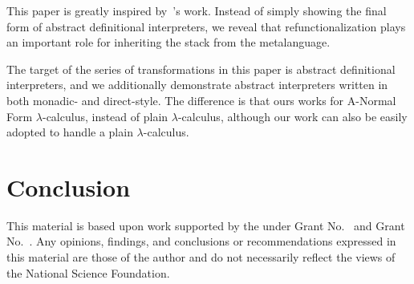 \documentclass[acmsmall,review,anonymous]{acmart}\settopmatter{printfolios=true,printccs=false,printacmref=false}
\begin{document}
This paper is greatly inspired by~\citeauthor{darais2017abstracting}'s work.
Instead of simply showing the final form of abstract definitional interpreters,
we reveal that refunctionalization plays an important role for inheriting the
stack from the metalanguage.

The target of the series of transformations in this paper is abstract definitional
interpreters, and we additionally demonstrate abstract interpreters written in both
monadic- and direct-style.
The difference is that ours works for A-Normal Form $\lambda$-calculus, instead of plain
$\lambda$-calculus, although our work can also be easily adopted to handle a plain
$\lambda$-calculus.

\section{Conclusion}\label{sec:conclusion}

\begin{acks}                            %
  This material is based upon work supported by the
   under Grant
  No.~ and Grant
  No.~.  Any opinions, findings, and
  conclusions or recommendations expressed in this material are those
  of the author and do not necessarily reflect the views of the
  National Science Foundation.
\end{acks}




\end{document}
